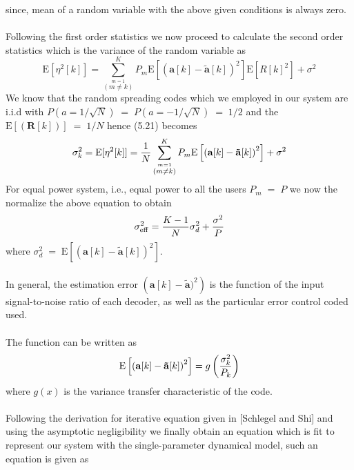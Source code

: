 since, mean of a random variable with the above given conditions is always zero. \\ \\
Following the first order statistics we now proceed to calculate the second order statistics which is the variance of the random variable as
\begin{equation}
\mathrm{E}[\eta^2[k]]=\sum\limits_{\stackrel{m=1}{(m\neq k)}}^{K}P_m\mathrm{E}\left[\left(\mathrm{\mathbf{a}}[k]-\mathrm{\mathbf{\tilde{a}}}[k]\right)^2\right]\mathrm{E}\left[R[k]^2\right]+\sigma^2
\end{equation}
We know that the random spreading codes which we employed in our system are i.i.d with $P(a=1/\sqrt{N})\;=\;P(a=-1/\sqrt{N})\;=\;1/2$ and the $\mathrm{E}\left[\left(\mathrm{\mathbf{R}}[k]\right)\right]\;=\;1/N$
hence (5.21) becomes
\begin{equation}
\sigma^2_k=\mathrm{E}[\eta^2[k]]=\frac{\hbox{$1$}}{\hbox{$N$}}\sum\limits_{\stackrel{m=1}{(m\neq k)}}^{K}P_m\mathrm{E}\left[\left(\mathrm{\mathbf{a}}[k]-\mathrm{\mathbf{\tilde{a}}}[k]\right)^2\right]+\sigma^2
\end{equation}
For equal power system, i.e., equal power to all the users $P_m\;=\;P$ we now the normalize the above equation to obtain
\begin{equation}
\sigma_{\mathrm{eff}}^2=\frac{\hbox{$K-1$}}{\hbox{$N$}}\sigma_d^2+\frac{\hbox{$\sigma^2$}}{\hbox{$P$}}
\end{equation}
where $\sigma_d^2\;=\;\mathrm{E}\left[\left(\mathrm{\mathbf{a}}[k]-\mathrm{\mathbf{\tilde{a}}}[k]\right)^2\right]$. \\ \\
In general, the estimation error $\left(\mathrm{\mathbf{a}}[k]-\mathrm{\mathbf{\tilde{a}}})^2\right)$ is the function of the input signal-to-noise ratio of each decoder, as well as the particular error control coded used.\\ \\
The function can be written as
\begin{equation}
\mathrm{E}\left[\left(\mathrm{\mathbf{a}}[k]-\mathrm{\mathbf{\tilde{a}}}[k]\right)^2\right]=g\left(\frac{\hbox{$\sigma_k^2$}}{\hbox{$P_k$}}\right)
\end{equation}
where $g(x)$ is the variance transfer characteristic of the code. \\ \\
Following the derivation for iterative equation given in [Schlegel and Shi] and using the asymptotic negligibility we finally obtain an equation which is fit to represent our system with the single-parameter dynamical model, such an equation is given as
